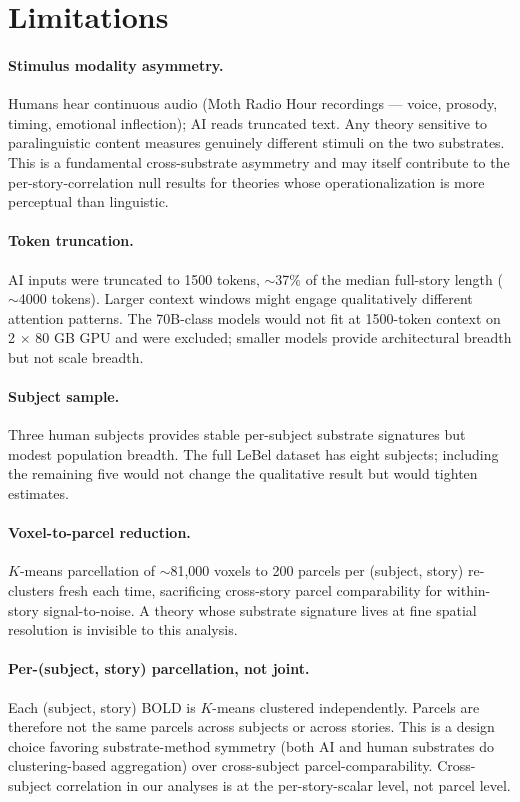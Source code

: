 \documentclass[11pt,a4paper]{article}
\begin{document}
\section{Limitations}
\label{sec:limitations}

\paragraph{Stimulus modality asymmetry.} Humans hear continuous audio (Moth Radio Hour recordings --- voice, prosody, timing, emotional inflection); AI reads truncated text. Any theory sensitive to paralinguistic content measures genuinely different stimuli on the two substrates. This is a fundamental cross-substrate asymmetry and may itself contribute to the per-story-correlation null results for theories whose operationalization is more perceptual than linguistic.

\paragraph{Token truncation.} AI inputs were truncated to 1500 tokens, $\sim$37\% of the median full-story length ($\sim$4000 tokens). Larger context windows might engage qualitatively different attention patterns. The 70B-class models would not fit at 1500-token context on 2 $\times$ 80 GB GPU and were excluded; smaller models provide architectural breadth but not scale breadth.

\paragraph{Subject sample.} Three human subjects provides stable per-subject substrate signatures but modest population breadth. The full LeBel dataset has eight subjects; including the remaining five would not change the qualitative result but would tighten estimates.

\paragraph{Voxel-to-parcel reduction.} $K$-means parcellation of $\sim$81{,}000 voxels to 200 parcels per (subject, story) re-clusters fresh each time, sacrificing cross-story parcel comparability for within-story signal-to-noise. A theory whose substrate signature lives at fine spatial resolution is invisible to this analysis.

\paragraph{Per-(subject, story) parcellation, not joint.} Each (subject, story) BOLD is $K$-means clustered independently. Parcels are therefore not the same parcels across subjects or across stories. This is a design choice favoring substrate-method symmetry (both AI and human substrates do clustering-based aggregation) over cross-subject parcel-comparability. Cross-subject correlation in our analyses is at the per-story-scalar level, not parcel level.
\end{document}
